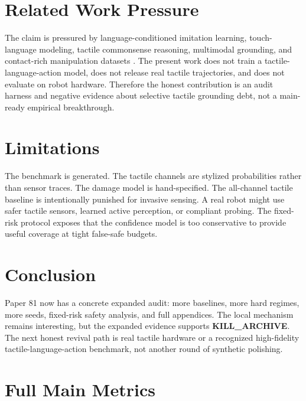 \documentclass{article}
\begin{document}
\section{Related Work Pressure}
The claim is pressured by language-conditioned imitation learning, touch-language modeling, tactile commonsense reasoning, multimodal grounding, and contact-rich manipulation datasets \citep{prior17,prior18,prior19,prior20,prior21,prior22,prior23,prior24}. The present work does not train a tactile-language-action model, does not release real tactile trajectories, and does not evaluate on robot hardware. Therefore the honest contribution is an audit harness and negative evidence about selective tactile grounding debt, not a main-ready empirical breakthrough.

\section{Limitations}
The benchmark is generated. The tactile channels are stylized probabilities rather than sensor traces. The damage model is hand-specified. The all-channel tactile baseline is intentionally punished for invasive sensing. A real robot might use safer tactile sensors, learned active perception, or compliant probing. The fixed-risk protocol exposes that the confidence model is too conservative to provide useful coverage at tight false-safe budgets.

\section{Conclusion}
Paper 81 now has a concrete expanded audit: more baselines, more hard regimes, more seeds, fixed-risk safety analysis, and full appendices. The local mechanism remains interesting, but the expanded evidence supports \textbf{KILL\_ARCHIVE}. The next honest revival path is real tactile hardware or a recognized high-fidelity tactile-language-action benchmark, not another round of synthetic polishing.

\clearpage
\appendix
\section{Full Main Metrics}
\end{document}
